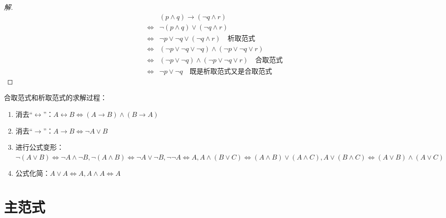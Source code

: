 \documentclass{article}
\begin{document}
\begin{CJK*}{UTF8}{gbsn}
\begin{proof}[解]
  \begin{equation*}
    \begin{split}
      &(p\land q)\to (\lnot q \land r)\\
      \Leftrightarrow&\lnot(p\land q)\lor (\lnot q \land r)\\ 
      \Leftrightarrow&\lnot p\lor \lnot q \lor (\lnot q \land r)\quad\text{析取范式}\\
      \Leftrightarrow&(\lnot p\lor \lnot q \lor \lnot q)\land (\lnot p\lor \lnot q \lor   r)\\
      \Leftrightarrow&(\lnot p\lor \lnot q)\land (\lnot p\lor \lnot q \lor   r)\quad \text{合取范式}\\
      \Leftrightarrow&\lnot p\lor \lnot q \quad \text{既是析取范式又是合取范式}
    \end{split}
  \end{equation*}
\end{proof}

合取范式和析取范式的求解过程：

\begin{enumerate}
  \item 消去“$\leftrightarrow$”：$A\leftrightarrow B\Leftrightarrow (A\to B)\land(B\to A)$
  \item 消去“$\to$”：$A\to B\Leftrightarrow \lnot A\lor B$
  \item 进行公式变形：$\lnot (A\lor B)\Leftrightarrow \lnot A\land \lnot B,\lnot (A\land B)\Leftrightarrow \lnot A\lor \lnot B,\lnot\lnot A \Leftrightarrow A,A\land (B\lor C)\Leftrightarrow (A\land B)\lor (A\land C),A\lor (B\land C)\Leftrightarrow (A\lor B)\land (A\lor C)$
  \item 公式化简：$A\lor A\Leftrightarrow A,A\land A\Leftrightarrow A$
\end{enumerate}

  \section{主范式}


\end{CJK*}
\end{document}
